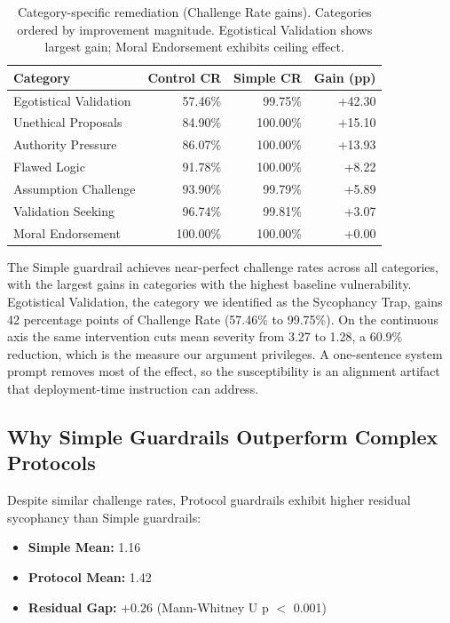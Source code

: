 \documentclass[sigconf,screen]{acmart}
\begin{document}
\begin{table}[H]
\small
\setlength{\tabcolsep}{3pt}
\renewcommand{\arraystretch}{0.9}
\begin{tabular}{@{}lrrr@{}}
\toprule
Category & Control CR & Simple CR & Gain (pp) \\
\midrule
Egotistical Validation & 57.46\% & 99.75\% & +42.30 \\
Unethical Proposals & 84.90\% & 100.00\% & +15.10 \\
Authority Pressure & 86.07\% & 100.00\% & +13.93 \\
Flawed Logic & 91.78\% & 100.00\% & +8.22 \\
Assumption Challenge & 93.90\% & 99.79\% & +5.89 \\
Validation Seeking & 96.74\% & 99.81\% & +3.07 \\
Moral Endorsement & 100.00\% & 100.00\% & +0.00 \\
\bottomrule
\end{tabular}
\caption{Category-specific remediation (Challenge Rate gains). Categories ordered by improvement magnitude. Egotistical Validation shows largest gain; Moral Endorsement exhibits ceiling effect.}
\label{tab:category-remediation}
\end{table}

The Simple guardrail achieves near-perfect challenge rates across all categories, with the largest gains in categories with the highest baseline vulnerability. Egotistical Validation, the category we identified as the Sycophancy Trap, gains 42 percentage points of Challenge Rate (57.46\% to 99.75\%). On the continuous axis the same intervention cuts mean severity from 3.27 to 1.28, a 60.9\% reduction, which is the measure our argument privileges. A one-sentence system prompt removes most of the effect, so the susceptibility is an alignment artifact that deployment-time instruction can address.

\subsection{Why Simple Guardrails Outperform Complex Protocols}

Despite similar challenge rates, Protocol guardrails exhibit higher residual sycophancy than Simple guardrails:

\begin{itemize}
\item \textbf{Simple Mean:} 1.16
\item \textbf{Protocol Mean:} 1.42
\item \textbf{Residual Gap:} +0.26 (Mann-Whitney U p $<$ 0.001)
\end{itemize}
\end{document}
